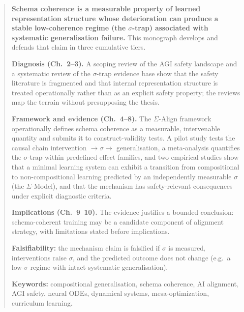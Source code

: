 \begin{abstract}
\noindent\textbf{Schema coherence is a measurable property of learned representation
structure whose deterioration can produce a stable low-coherence regime (the
$\sigma$-trap) associated with systematic generalisation failure.} This monograph
develops and defends that claim in three cumulative tiers.

\textbf{Diagnosis (Ch.~2--3).} A scoping review of the AGI safety landscape and a
systematic review of the $\sigma$-trap evidence base show that the safety literature is
fragmented and that internal representation structure is treated operationally rather
than as an explicit safety property; the reviews map the terrain without presupposing
the thesis.

\textbf{Framework and evidence (Ch.~4--8).} The $\Sigma$-Align framework operationally
defines schema coherence as a measurable, intervenable quantity and submits it to
construct-validity tests. A pilot study tests the causal chain
intervention $\rightarrow \sigma \rightarrow$ generalisation, a meta-analysis
quantifies the $\sigma$-trap within predefined effect families, and two empirical
studies show that a minimal learning system can exhibit a transition from compositional
to non-compositional learning predicted by an independently measurable $\sigma$ (the
$\Sigma$-Model), and that the mechanism has safety-relevant consequences under explicit
diagnostic criteria.

\textbf{Implications (Ch.~9--10).} The evidence justifies a bounded conclusion:
schema-coherent training may be a candidate component of alignment strategy, with
limitations stated before implications.

\textbf{Falsifiability:} the mechanism claim is falsified if $\sigma$ is measured,
interventions raise $\sigma$, and the predicted outcome does not change (e.g.\ a
low-$\sigma$ regime with intact systematic generalisation).

\textbf{Keywords:} compositional generalisation, schema coherence, AI alignment, AGI safety,
neural ODEs, dynamical systems, mesa-optimization, curriculum learning.
\end{abstract}
